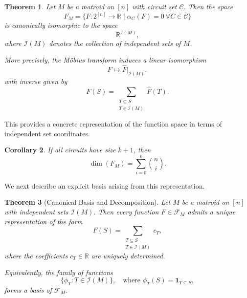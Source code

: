 \documentclass{amsart}
\newtheorem{theorem}{Theorem}[section]
\newtheorem{corollary}[theorem]{Corollary}
\theoremstyle{definition}
\begin{document}
\begin{theorem}\label{thm:CIsoThm}
Let $M$ be a matroid on $[n]$ with circuit set $\mathcal{C}$. Then the space
\[
F_M = \{F : 2^{[n]} \to \mathbb{R} \mid \alpha_C(F) = 0 \ \forall C \in \mathcal{C} \}
\]
is canonically isomorphic to the space
\[
\mathbb{R}^{\mathcal{I}(M)},
\]
where $\mathcal{I}(M)$ denotes the collection of independent sets of $M$.

More precisely, the Möbius transform induces a linear isomorphism
\[
F \mapsto \widehat{F}\big|_{\mathcal{I}(M)},
\]
with inverse given by
\[
F(S) = \sum_{\substack{T \subseteq S \\ T \in \mathcal{I}(M)}} \widehat{F}(T).
\]
\end{theorem}
\noindent
This provides a concrete representation of the function space in terms of independent set coordinates.
\noindent
\begin{corollary}
If all circuits have size $k+1$, then
\[
\dim(F_M) = \sum_{i=0}^k \binom{n}{i}.
\]
\end{corollary}
\noindent
We next describe an explicit basis arising from this representation.

\begin{theorem}[Canonical Basis and Decomposition]
Let $M$ be a matroid on $[n]$ with independent sets $\mathcal{I}(M)$. Then every function $F \in \mathcal{F}_M$ admits a unique representation of the form
\[
F(S) = \sum_{\substack{T \subseteq S \\ T \in \mathcal{I}(M)}} c_T,
\]
where the coefficients $c_T \in \mathbb{R}$ are uniquely determined.

Equivalently, the family of functions
\[
\{\phi_T : T \in \mathcal{I}(M)\}, \quad \text{where } \phi_T(S) = \mathbf{1}_{T \subseteq S},
\]
forms a basis of $\mathcal{F}_M$.
\end{theorem}
\end{document}
